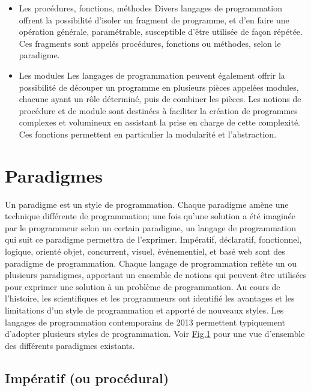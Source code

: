 \documentclass[a4paper,12pt]{article}
\begin{document}
\begin{itemize}[label=\textbullet]
\item Les procédures, fonctions, méthodes
\newline Divers langages de programmation offrent la possibilité d'isoler un fragment de programme, et d'en faire une opération générale, paramétrable, susceptible d'être utilisée de façon répétée. Ces fragments sont appelés procédures, fonctions ou méthodes, selon le paradigme.

\item Les modules
\newline Les langages de programmation peuvent également offrir la possibilité de découper un programme en plusieurs pièces appelées modules, chacune ayant un rôle déterminé, puis de combiner les pièces\cite{william}.
\newline Les notions de procédure et de module sont destinées à faciliter la création de programmes complexes et volumineux en assistant la prise en charge de cette complexité. Ces fonctions permettent en particulier la modularité et l'abstraction\cite{william}.

\end{itemize}

\section{Paradigmes}

Un paradigme est un style de programmation\cite{kumar}. Chaque paradigme amène une technique différente de programmation; une fois qu'une solution a été imaginée par le programmeur selon un certain paradigme, un langage de programmation qui suit ce paradigme permettra de l'exprimer\cite{jana}. Impératif, déclaratif, fonctionnel, logique, orienté objet, concurrent, visuel, événementiel, et basé web sont des paradigme de programmation\cite{kumar}. Chaque langage de programmation reflète un ou plusieurs paradigmes, apportant un ensemble de notions qui peuvent être utilisées pour exprimer une solution à un problème de programmation\cite{jana}. Au cours de l'histoire, les scientifiques et les programmeurs ont identifié les avantages et les limitations d'un style de programmation et apporté de nouveaux styles\cite{kumar}. Les langages de programmation contemporains de 2013 permettent typiquement d'adopter plusieurs styles de programmation\cite{kumar}. Voir \hyperref[paradigme]{Fig.1} pour une vue d'ensemble des différents paradigmes existants.

\subsection{Impératif (ou procédural)}
\end{document}
